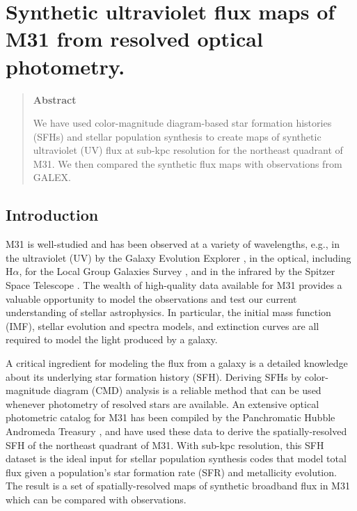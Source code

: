 \chapter{Synthetic ultraviolet flux maps of M31 from resolved optical
    photometry.
}
\label{m31flux}

\begin{quote}
\begin{center}
\textbf{\large Abstract}
\end{center}

We have used color-magnitude diagram-based star formation histories (SFHs) and
stellar population synthesis to create maps of synthetic ultraviolet (UV) flux at
sub-kpc resolution for the northeast quadrant of M31. We then compared the
synthetic flux maps with observations from GALEX.

\end{quote}


\section{Introduction}

M31 is well-studied and has been observed at a variety of wavelengths, e.g., in
the ultraviolet (UV) by the Galaxy Evolution Explorer
\citep[GALEX][]{Morrissey:2007}, in the optical, including H$\alpha$, for the
Local Group Galaxies Survey \citep{Massey:2006}, and in the infrared by the
Spitzer Space Telescope \citep{Gordon:2006}. The wealth of high-quality data
available for M31 provides a valuable opportunity to model the observations and
test our current understanding of stellar astrophysics. In particular, the
initial mass function (IMF), stellar evolution and spectra models, and
extinction curves are all required to model the light produced by a galaxy.

A critical ingredient for modeling the flux from a galaxy is a detailed
knowledge about its underlying star formation history (SFH). Deriving SFHs by
color-magnitude diagram (CMD) analysis is a reliable method that can be used
whenever photometry of resolved stars are available. An extensive optical
photometric catalog for M31 has been compiled by the Panchromatic Hubble
Andromeda Treasury \citep[PHAT][]{Dalcanton:2012}, and \citet{Lewis:2014} have
used these data to derive the spatially-resolved SFH of the northeast quadrant
of M31. With sub-kpc resolution, this SFH dataset is the ideal input for
stellar population synthesis codes that model total flux given a population's
star formation rate (SFR) and metallicity evolution. The result is a set of
spatially-resolved maps of synthetic broadband flux in M31 which can be
compared with observations.

